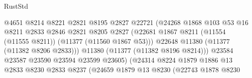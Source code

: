\begin{lexlean}{RustStd}
\begin{coremodule}
                                            @4651
                                            @8214
                                            @8221
                                            @2821
                                            @8195
                                            @2827
                                            @22721
                                            (@24268
                                              @1868
                                              @103
                                              @53
                                              @16
                                              @8211
                                              @2833
                                              @2846
                                              @2821
                                              @8205
                                              @2827
                                              (@22681
                                                @1867
                                                @8211
                                                (@11554 (@11555 @8211))
                                                (@11377 (@11560 @1867 @53)))
                                              @22648
                                              @11380
                                              (@11377 (@11382 @8206 @2833)))
                                            @11380
                                            (@11377 (@11382 @8196 @8214)))
                                          @23584
                                          @23587
                                          @23590
                                          @23594
                                          @23599
                                          @23605)
                                        (@24314
                                          @8224
                                          @1879
                                          @1886
                                          @13
                                          @2833
                                          @8230
                                          @2833
                                          @8237
                                          (@24659
                                            @1879
                                            @13
                                            @8230
                                            (@22743
                                              @1878
                                              @8230

\end{coremodule}
\end{lexlean}
